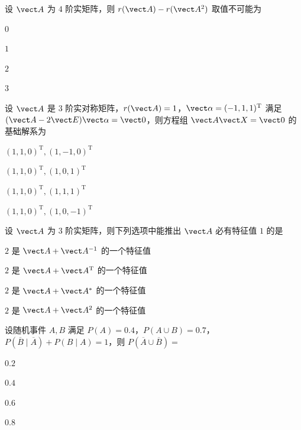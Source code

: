 \begin{question}[index=5]
设 $\vect A$ 为 $4$ 阶实矩阵，则 $r(\vect A)-r(\vect A^2)$ 取值不可能为
\begin{choices}[columns=4]
\item $0$
\item $1$
\item $2$
\item $3$
\end{choices}
\end{question}
\QuestionBreak

\begin{question}[index=6]
设 $\vect A$ 是 $3$ 阶实对称矩阵，$r(\vect A)=1$，$\vect\alpha=(-1,1,1)^{\mathrm T}$ 满足 $(\vect A-2\vect E)\vect\alpha=\vect0$，则方程组 $\vect A\vect X=\vect0$ 的基础解系为
\begin{choices}[columns=2]
\item $(1,1,0)^{\mathrm T},(1,-1,0)^{\mathrm T}$
\item $(1,1,0)^{\mathrm T},(1,0,1)^{\mathrm T}$
\item $(1,1,0)^{\mathrm T},(1,1,1)^{\mathrm T}$
\item $(1,1,0)^{\mathrm T},(1,0,-1)^{\mathrm T}$
\end{choices}
\end{question}
\QuestionBreak

\begin{question}[index=7]
设 $\vect A$ 为 $3$ 阶实矩阵，则下列选项中能推出 $\vect A$ 必有特征值 $1$ 的是
\begin{choices}[columns=2]
\item $2$ 是 $\vect A+\vect A^{-1}$ 的一个特征值
\item $2$ 是 $\vect A+\vect A^{\mathrm T}$ 的一个特征值
\item $2$ 是 $\vect A+\vect A^*$ 的一个特征值
\item $2$ 是 $\vect A+\vect A^2$ 的一个特征值
\end{choices}
\end{question}
\QuestionBreak

\begin{question}[index=8]
设随机事件 $A,B$ 满足 $P(A)=0.4$，$P(A\cup B)=0.7$，$P(\overline B\mid\overline A)+P(B\mid A)=1$，则 $P(\overline A\cup\overline B)=$
\begin{choices}[columns=4]
\item $0.2$
\item $0.4$
\item $0.6$
\item $0.8$
\end{choices}
\end{question}
\QuestionBreak


